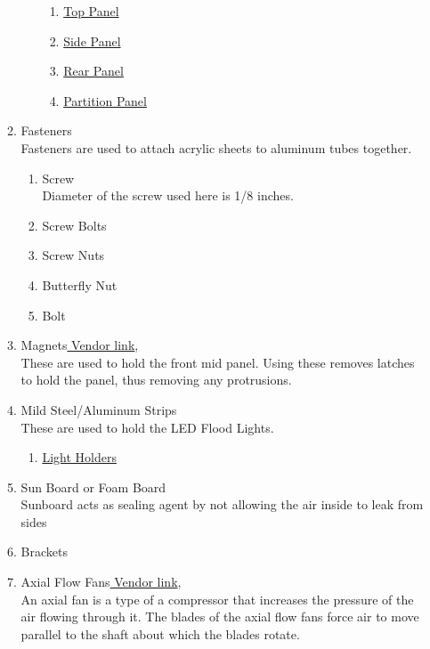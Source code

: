 \documentclass[a4paper,12pt,oneside]{book}
\begin{document}
\begin{itemize}
\begin{enumerate}
\begin{enumerate}
  \begin{enumerate}
  \item \href{http://a360.co/2sGOZLh}{Top Panel}
  \item \href{http://a360.co/2tpwkkd}{Side Panel}
  \item \href{http://a360.co/2sMPwGt}{Rear Panel}
  \item \href{http://a360.co/2sGHmog}{Partition Panel}
  \end{enumerate}
   \end{enumerate}
  \item Fasteners\\
  Fasteners are used to attach acrylic sheets to aluminum tubes together. 
  \begin{enumerate}
  \item Screw\\
  Diameter of the screw used here is 1/8 inches.
  \item Screw Bolts
  \item Screw Nuts
  \item Butterfly Nut
  \item Bolt
  \end{enumerate}
  \item Magnets\href{http://www.amazon.in/Perfect-Magnets-Nickel-Coated-Pieces/dp/B01LY18VN3/ref=sr_1_7?ie=UTF8&qid=1499193943&sr=8-7&keywords=magnets}{ Vendor link},\\
  These are used to hold the front mid panel. Using these removes latches to hold the panel, thus removing any protrusions. 
  \item Mild Steel/Aluminum Strips\\
  These are used to hold the LED Flood Lights.
  \begin{enumerate}
  \item \href{http://a360.co/2sGs5DH}{Light Holders}
   \end{enumerate}
  \item Sun Board or Foam Board\\
   Sunboard acts as sealing agent by not allowing the air inside to leak from sides
  \item Brackets
  \item Axial Flow Fans\href{http://www.amazon.in/60x60x25mm-Brushless-12V-Cooling-Fan/dp/B01MS9AHPC/ref=sr_1_99?ie=UTF8&qid=1499194646&sr=8-99&keywords=dc+fans+12v}{ Vendor link},\\
  An axial fan is a type of a compressor that increases the pressure of the air flowing through it. The blades of the axial flow fans force air to move parallel to the shaft about which the blades rotate.\\

\end{enumerate}
\end{itemize}
\end{document}
